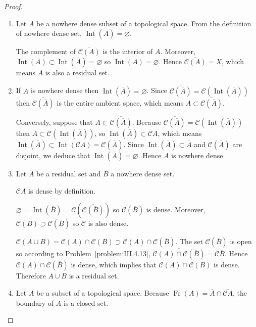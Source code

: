 \begin{proof}
    \begin{enumerate}[label={(\arabic*)},itemsep=0pt,leftmargin=*]
        \item Let \(A\) be a nowhere dense subset of a topological space. From the definition of nowhere dense set, \( \operatorname{Int}(\overline{A}) = \varnothing \).

              The complement of \( \overline{\mathscr{C}(A)} \) is the interior of \(A\). Moreover, \( \operatorname{Int}(A) \subset \operatorname{Int}(\overline{A}) = \varnothing \) so \( \operatorname{Int}(A) = \varnothing \). Hence \( \overline{\mathscr{C}(A)} = X \), which means \(A\) is also a residual set.
        \item If \(A\) is nowhere dense then \( \operatorname{Int}(\overline{A}) = \varnothing \). Since \( \overline{\mathscr{C}(\overline{A})} = \mathscr{C}(\operatorname{Int}(\overline{A})) \) then \( \overline{\mathscr{C}(\overline{A})} \) is the entire ambient space, which means \( A \subset \overline{\mathscr{C}(\overline{A})} \).

              Conversely, suppose that \( A \subset \overline{\mathscr{C}(\overline{A})} \). Because \( \overline{\mathscr{C}(\overline{A})} = \mathscr{C}(\operatorname{Int}(\overline{A})) \) then \( A \subset \mathscr{C}(\operatorname{Int}(\overline{A})) \), so \( \operatorname{Int}(\overline{A}) \subset \mathscr{C}A \), which means \( \operatorname{Int}(\overline{A}) \subset \operatorname{Int}(\mathscr{C}A) = \mathscr{C}(\overline{A}) \). Since \( \operatorname{Int}(\overline{A}) \subset \overline{A} \) and \( \mathscr{C}(\overline{A}) \) are disjoint, we deduce that \( \operatorname{Int}(\overline{A}) = \varnothing \). Hence \(A\) is nowhere dense.
        \item Let \(A\) be a residual set and \(B\) a nowhere dense set.

              \( \mathscr{C}A \) is dense by definition.

              \( \varnothing = \operatorname{Int}(\overline{B}) = \mathscr{C}(\overline{\mathscr{C}(\overline{B})}) \) so \( \mathscr{C}(\overline{B}) \) is dense. Moreover, \( \mathscr{C}(B) \supset \mathscr{C}(\overline{B}) \) so \( \mathscr{C} \) is also dense.

              \( \mathscr{C}(A \cup B) = \mathscr{C}(A) \cap \mathscr{C}(B) \supset \mathscr{C}(A) \cap \mathscr{C}(\overline{B}) \). The set \( \mathscr{C}(\overline{B}) \) is open so according to Problem~\ref{problem:III.4.13}, \( \overline{\mathscr{C}(A) \cap \mathscr{C}(\overline{B})} = \overline{\mathscr{C}\overline{B}} \). Hence \(\mathscr{C}(A) \cap \mathscr{C}(\overline{B})\) is dense, which implies that \(\mathscr{C}(A) \cap \mathscr{C}(B)\) is dense. Therefore \(A \cup B\) is a residual set.
        \item Let \(A\) be a subset of a topological space. Because \( \operatorname{Fr}(A) = \overline{A} \cap \overline{\mathscr{C}A} \), the boundary of \(A\) is a closed set.


\end{enumerate}
\end{proof}

